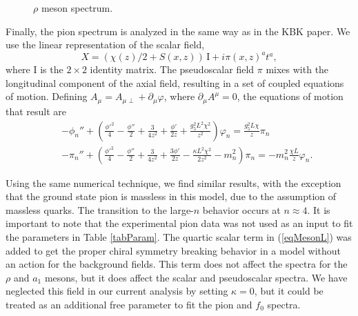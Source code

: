 \documentclass[12pt]{article}
\newcommand{\be}{\begin{equation}}
\newcommand{\ee}{\end{equation}}
\newcommand{\ba}{\begin{eqnarray}}
\newcommand{\ea}{\end{eqnarray}}
\begin{document}
\begin{figure}[htb]
\caption{$\rho$ meson spectrum.}
\label{figRho}
\end{figure}

Finally, the pion spectrum is analyzed in the same way as in the KBK paper.
We use the linear representation of the scalar field,
\be
X = \left(\chi(z)/2+S(x,z)\right) \, \text{I} + i \pi(x,z)^{a}t^{a},
\ee
where $\text{I}$ is the $2\times2$ identity matrix.
The pseudoscalar field $\pi$ mixes with the longitudinal component of the axial field, resulting in a set of coupled equations of motion.
Defining $A_\mu =A_{\mu\perp}+\partial_\mu \varphi$, where $\partial_\mu A^\mu=0$, the equations of motion that result are
\ba
&&-\phi_{n}'' + \left(\frac{\phi'^{2}}{4} - \frac{\phi''}{2} + \frac{3}{4z^{2}} + \frac{\phi'}{2 z} + \frac{g_{5}^{2}L^{2}\chi^{2}}{z^{2}}\right)\varphi_{n} = \frac{g_{5}^{2}L \chi}{z}\pi_{n}\label{eqSchphi} \\
&&-\pi_{n}'' + \left(\frac{\phi'^{2}}{4} - \frac{\phi''}{2} + \frac{3}{4z^{2}} + \frac{3\phi'}{2 z} - \frac{\kappa L^{2}\chi^{2}}{2z^{2}} - m_{n}^{2} \right)\pi_{n} = -m_{n}^{2}\frac{\chi L}{z}\varphi_{n}.  \label{eqSchpi}
\ea

Using the same numerical technique, we find similar results, with the exception that the ground state pion is massless in this model, due to the assumption of massless quarks. 
The transition to the large-$n$ behavior occurs at $n\approx 4$. 
It is important to note that the experimental pion data was not used as an input to fit the parameters in Table \ref{tabParam}.
The quartic scalar term in (\ref{eqMesonL}) was added to get the proper chiral symmetry breaking behavior in a model without an action for the background fields.
This term does not affect the spectra for the $\rho$ and $a_1$ mesons, but it does affect the scalar and pseudoscalar spectra.
We have neglected this field in our current analysis by setting $\kappa = 0$, but it could be treated as an additional free parameter to fit the pion and $f_0$ spectra.
\end{document}
